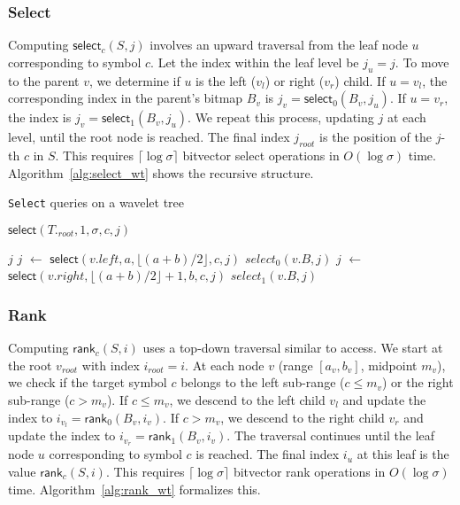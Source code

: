 \subsubsection{Select}
Computing $\textsf{select}_c(S, j)$ involves an upward traversal from the leaf node $u$ corresponding to symbol $c$. Let the index within the leaf level be $j_u = j$. To move to the parent $v$, we determine if $u$ is the left ($v_l$) or right ($v_r$) child. If $u = v_l$, the corresponding index in the parent's bitmap $B_v$ is $j_v = \textsf{select}_0(B_v, j_u)$. If $u = v_r$, the index is $j_v = \textsf{select}_1(B_v, j_u)$. We repeat this process, updating $j$ at each level, until the root node is reached. The final index $j_{root}$ is the position of the $j$-th $c$ in $S$. This requires $\lceil \log \sigma \rceil$ bitvector \textsf{select} operations in $O(\log \sigma)$ time. Algorithm~\ref{alg:select_wt} shows the recursive structure.

\begin{algorithm}
    \caption{\texttt{Select} queries on a wavelet tree}\label{alg:select_wt}
    \small
    \begin{algorithmic}
        \State \Return $\textsf{select}(T._{root},1, \sigma, c, j)$
        \EndFunction


        \State \Return $j$
        \EndIf
        \State $j$ $\gets$ $\textsf{select}(v.left, a, \lfloor (a+b)/2 \rfloor, c, j)$
        \Return $select_0(v.B,j)$
        \Else
        \State $j$ $\gets$ $\textsf{select}(v.right, \lfloor (a+b)/2 \rfloor +1, b, c, j)$
        \State \Return $select_1(v.B,j)$
        \EndIf
        \EndFunction
    \end{algorithmic}
\end{algorithm}

\subsubsection{Rank}
Computing $\textsf{rank}_c(S, i)$ uses a top-down traversal similar to \textsf{access}. We start at the root $v_{root}$ with index $i_{root} = i$. At each node $v$ (range $[a_v, b_v]$, midpoint $m_v$), we check if the target symbol $c$ belongs to the left sub-range ($c \le m_v$) or the right sub-range ($c > m_v$). If $c \le m_v$, we descend to the left child $v_l$ and update the index to $i_{v_l} = \textsf{rank}_0(B_v, i_v)$. If $c > m_v$, we descend to the right child $v_r$ and update the index to $i_{v_r} = \textsf{rank}_1(B_v, i_v)$. The traversal continues until the leaf node $u$ corresponding to symbol $c$ is reached. The final index $i_u$ at this leaf is the value $\textsf{rank}_c(S, i)$. This requires $\lceil \log \sigma \rceil$ bitvector \textsf{rank} operations in $O(\log \sigma)$ time. Algorithm~\ref{alg:rank_wt} formalizes this.

